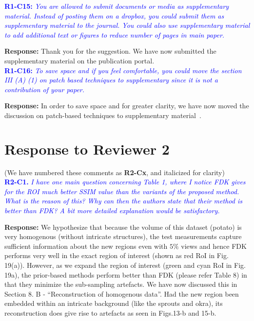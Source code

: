 \documentclass{article}
\begin{document}
\textcolor{blue}{\textbf{R1-C15:}\textit{ You are allowed to submit documents or media as supplementary material. Instead of posting them on a dropbox, you could submit them as supplementary material to the journal. You could also use supplementary material to add additional text or figures to reduce number of pages in main paper.}}
    
\textbf{Response:} Thank you for the suggestion. We have now submitted the supplementary material  on the publication portal. \\

\textcolor{blue}{\textbf{R1-C16:}\textit{ To save space and if you feel comfortable, you could move the section III (A) (1) on patch based techniques to supplementary since it is not a contribution of your paper.}}
    
\textbf{Response:} In order to save space and for greater clarity, we have now moved the discussion on patch-based techniques to supplementary material~\cite{supp_paper}.

\section{Response to Reviewer 2}
(We have numbered these comments as \textbf{R2-Cx}, and italicized for clarity)\\

\textcolor{blue}{\textbf{R2-C1.}\textit{ I have one main question concerning Table 1, where I notice FDK gives for the ROI much better SSIM value than the variants of the proposed method. What is the reason of this? Why can then the authors state that their method is better than FDK? A bit more detailed explanation would be satisfactory.}}

\textbf{Response:} We hypothesize that because the volume of this dataset (potato) is very homogenous (without intricate  structures), the test measurements capture sufficient information about the new regions even with $5\%$ views and hence FDK performs very well in the exact region of interest (shown as red RoI in Fig. 19(a)). However, as we expand the region of interest (green and cyan RoI in Fig. 19a), the prior-based methods perform better than FDK (please refer Table 8) in that they minimize the sub-sampling artefacts.  We have now discussed this in Section 8. B - ``Reconstruction of homogenous data''.
Had the new region been embedded within an intricate background (like the sprouts and okra), its reconstruction does give rise to artefacts as seen in Figs.13-b and 15-b. 
\end{document}
